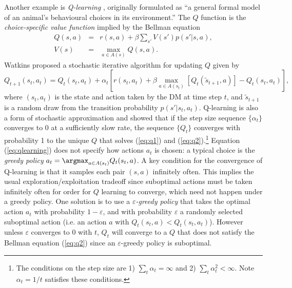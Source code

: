 Another example is {\it Q-learning\/} \citep{Watkins:1989}, originally formulated as ``a general
formal model of an animal's behavioural choices in its environment.'' 
The $Q$ function is the {\it choice-specific value function\/} implied by the  Bellman equation
\begin{eqnarray}
      Q(s,a) &=& r(s,a) + \beta \sum_{s'} V(s')p(s'|s,a), \label{eq:q1}   \\
      V(s) &=& \max_{a \in A(s)} Q(s,a).
\label{eq:q2}
\end{eqnarray}
Watkins proposed a stochastic iterative algorithm for updating $Q$ given by
\begin{equation}
   Q_{t+1}(s_t,a_t)= Q_t(s_t,a_t) + \alpha_t \left[ r(s_t,a_t)+\beta \max_{a \in A(s_t)}[Q_t(\tilde s_{t+1},a)] - Q_t(s_t,a_t) \right],
\label{eq:qlearning}
\end{equation}
where $(s_t,a_t)$ is the state and action taken by the DM at time step $t$, and $\tilde s_{t+1}$ is a random draw from the transition probability
$p(s'|s_t,a_t)$. Q-learning is also a form of stochastic approximation and \citet{Tsitsiklis:1994}
showed that if the step size sequence $\{\alpha_t\}$ converges to 0 at a sufficiently slow rate, the sequence $\{Q_t\}$ converges with probability 1 
to the unique $Q$ that solves (\ref{eq:q1}) and (\ref{eq:q2}).\footnote{\footnotesize 
The conditions on the step size are 1) $\sum_t \alpha_t = \infty$
and 2) $\sum_t \alpha_t^2 < \infty$. Note $\alpha_t=1/t$ satisfies these conditions.}
Equation (\ref{eq:qlearning}) does not specify how actions $a_t$ is chosen: a typical choice is the {\it greedy policy\/}
$a_t = \argmax_{a \in A(s_t)} Q_t(s_t,a)$. A key condition for the convergence of Q-learning is 
that it samples each pair $(s,a)$ infinitely often.
This implies the usual exploration/exploitation tradeoff since suboptimal actions must
be taken infinitely often for order for $Q$ learning to converge, which need not happen under a greedy policy.
One solution is to use a {\it $\varepsilon$-greedy policy\/} that takes the optimal action $a_t$
 with probability $1-\varepsilon$, and with probability $\varepsilon$ a randomly selected 
suboptimal action (i.e. an action $a$ with $Q_t(s_t,a)<Q_t(s_t,a_t)$). However unless $\varepsilon$ converges
to $0$ with $t$, $Q_t$ will converge to a $Q$ that does not satisfy the Bellman equation (\ref{eq:q2})
since an $\varepsilon$-greedy policy is suboptimal.

